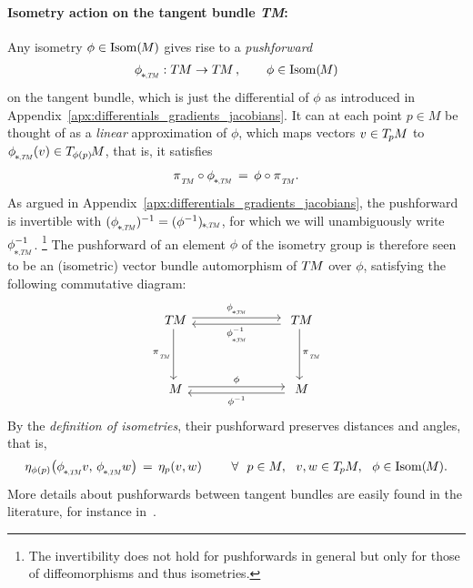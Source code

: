 \paragraph{Isometry action on the tangent bundle \textit{TM}:}

Any isometry $\phi \in \operatorname{Isom}(\mkern-1.5mu M \mkern-.5mu)$ gives rise to a \emph{pushforward}
\begin{align}
    \dphiTM: \TM \to \TM \,, \qquad \phi\in \IsomM
\end{align}
on the tangent bundle, which is just the differential of $\phi$ as introduced in Appendix~\ref{apx:differentials_gradients_jacobians}.
It can at each point $p \in M$ be thought of as a \emph{linear} approximation of $\phi$, which maps vectors $v \in T_{\mkern-1.5mu p}\mkern-.5muM$ to $\dphiTM(v) \in T_{\mkern-1mu\phi(p)}\mkern-2mu M$, that is, it satisfies
\begin{align}\label{eq:pushfwd_bundle_automorphism}
    \piTM \circ \dphiTM \,=\, \phi \circ \piTM.
\end{align}
As argued in Appendix~\ref{apx:differentials_gradients_jacobians}, the pushforward is invertible with $(\dphiTM)^{-1} = (\phi^{-1})_{\mkern-2mu*\mkern-1mu\scalebox{.55}{$,\mkern-2muT\mkern-3muM$}}$, for which we will unambiguously write $\dphiTMinv$.%
\footnote{
    The invertibility does not hold for pushforwards in general but only for those of diffeomorphisms and thus isometries.
}
The pushforward of an element $\phi$ of the isometry group is therefore seen to be an (isometric) vector bundle automorphism of $T\mkern-1.5muM$ over $\phi$, satisfying the following commutative diagram:
\begin{equation}\label{cd:pushforward_TM}
\begin{tikzcd}[column sep=70pt, row sep=40, font=\normalsize]
    \TM
        \arrow[r, shift left=2.5pt, "\dphiTM"]
        \arrow[d, "\piTM"']
    &
    \TM
        \arrow[d, "\piTM"]
        \arrow[l, shift left=2.5pt, "\dphiTMinv"]
    \\
    M
        \arrow[r, shift left=2.5pt, "\phi"]
    &
    M
        \arrow[l, shift left=2.5pt, "\phiinv"]
\end{tikzcd}
\end{equation}
By the \emph{definition of isometries}, their pushforward preserves distances and angles, that is, 
\begin{align}\label{eq:metric_pushfwd_isometry}
    \eta_{\phi(p)} \big(\dphiTM v,\, \dphiTM w\big) \,=\, \eta_p(v,w)
    \qquad\ \forall\ \ p\in M,\ \  v,w\in \TpM,\ \ \phi \in \IsomM .
\end{align}
More details about pushforwards between tangent bundles are easily found in the literature, for instance in~\cite{schullerGeometricalAnatomy2016}.




